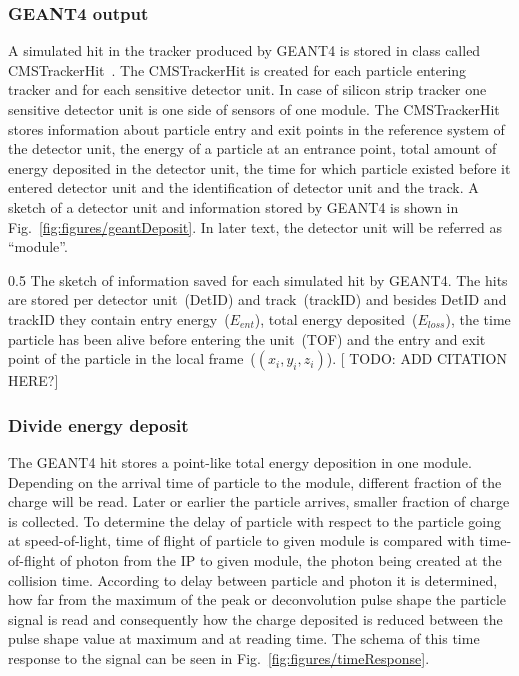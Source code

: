 \subsubsection{GEANT4 output}

A simulated hit in the tracker produced by GEANT4 is stored in class called CMSTrackerHit~\cite{Lefebure:1364020}. The CMSTrackerHit is created for each particle entering tracker and for each sensitive detector unit. In case of silicon strip tracker one sensitive detector unit is one side of sensors of one module. The CMSTrackerHit stores information about particle entry and exit points in the reference system of the detector unit, the energy of a particle at an entrance point, total amount of energy deposited in the detector unit, the time for which particle existed before it entered detector unit and the identification of detector unit and the track. A sketch of a detector unit and information stored by GEANT4 is shown in Fig.~\ref{fig:figures/geantDeposit}. In later text, the detector unit will be referred as ``module''.

                 {0.5}       %
                 { The sketch of information saved for each simulated hit by GEANT4. The hits are stored per detector unit~(DetID) and track~(trackID) and besides DetID and trackID they contain entry energy~($E_{ent}$), total energy deposited~($E_{loss}$), the time particle has been alive before entering the unit~(TOF) and the entry and exit point of the particle in the local frame~($(x_{i},y_{i},z_{i})$). [ TODO: ADD CITATION HERE?]}

\subsubsection{Divide energy deposit}

The GEANT4 hit stores a point-like total energy deposition in one module. Depending on the arrival time of particle to the module, different fraction of the charge will be read. Later or earlier the particle arrives, smaller fraction of charge is collected. To determine the delay of particle with respect to the particle going at speed-of-light, time of flight of particle to given module is compared with time-of-flight of photon from the IP to given module, the photon being created at the collision time. According to delay between particle and photon it is determined, how far from the maximum of the peak or deconvolution pulse shape the particle signal is read and consequently how the charge deposited is reduced between the pulse shape value at maximum and at reading time. The schema of this time response to the signal can be seen in Fig.~\ref{fig:figures/timeResponse}.


